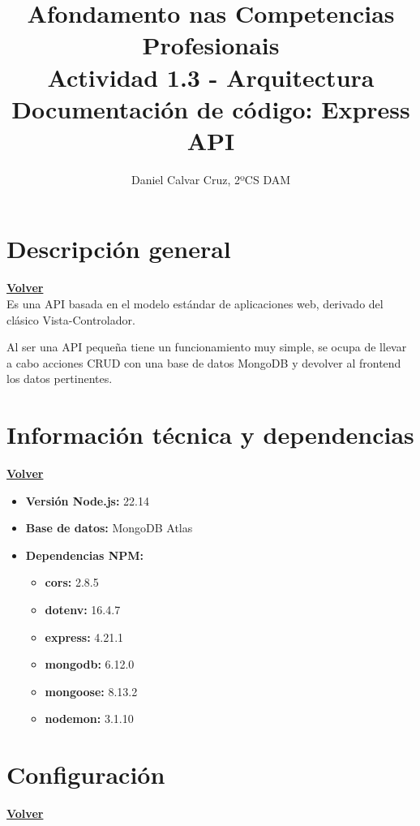 \documentclass[a4paper,12pt]{article}
\title{\textbf{Afondamento nas Competencias Profesionais}\\[1em]\textbf{Actividad 1.3 - Arquitectura}\\[1em]Documentación de código: Express API}
\author{Daniel Calvar Cruz, 2ºCS DAM}
\date{}
\begin{document}
\maketitle
\clearpage
\hypertarget{anchor-indice}{}
\tableofcontents
\newpage

\section{Descripción general}
\hyperlink{anchor-indice}{\textbf{Volver}}\\

Es una API basada en el modelo estándar de aplicaciones web, derivado del clásico Vista-Controlador.

Al ser una API pequeña tiene un funcionamiento muy simple, se ocupa de llevar a cabo acciones CRUD con una base de datos MongoDB y devolver al frontend los datos pertinentes.

\clearpage

\section{Información técnica y dependencias}
\hyperlink{anchor-indice}{\textbf{Volver}}\\



\begin{itemize}
    \item \textbf{Versión Node.js:} 22.14
    \item \textbf{Base de datos:} MongoDB Atlas
    \item \textbf{Dependencias NPM:}
    \begin{itemize}
        \item \textbf{cors:} 2.8.5
        \item \textbf{dotenv:} 16.4.7
        \item \textbf{express:} 4.21.1
        \item \textbf{mongodb:} 6.12.0
        \item \textbf{mongoose:} 8.13.2
        \item \textbf{nodemon:} 3.1.10  
    \end{itemize}
\end{itemize}
\clearpage

\section{Configuración}
\hyperlink{anchor-indice}{\textbf{Volver}}\\
\end{document}
